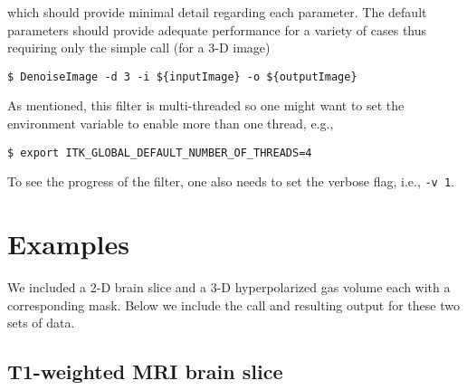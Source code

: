 \documentclass{InsightArticle}
\begin{document}
\normalsize
which should provide minimal detail regarding each parameter.  The default parameters
should provide adequate performance for a variety of cases thus requiring only the simple
call (for a 3-D image)

\small
\begin{verbatim}
$ DenoiseImage -d 3 -i ${inputImage} -o ${outputImage}
\end{verbatim}
\normalsize

As mentioned, this filter is multi-threaded so one might want to set the environment
variable to enable more than one thread, e.g.,
\small
\begin{verbatim}
$ export ITK_GLOBAL_DEFAULT_NUMBER_OF_THREADS=4
\end{verbatim}
\normalsize

To see the progress of the filter, one also needs to set the verbose flag, i.e.,
\verb#-v 1#.

\section{Examples}

We included a 2-D brain slice and a 3-D hyperpolarized gas volume each with a corresponding
mask.  Below we include the call and resulting output for these two sets of data.

\subsection{T1-weighted MRI brain slice}
\end{document}
